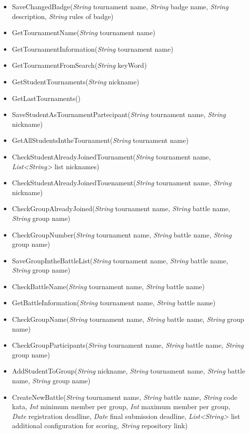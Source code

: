 \begin{itemize}
\begin{itemize}
        \item SaveChangedBadge(\textit{String} tournament name, \textit{String} badge name, \textit{String} description, \textit{String} rules of badge)
        \item GetTournamentName(\textit{String} tournament name)
        \item GetTournamentInformation(\textit{String} tournament name)
        \item GetTournamentFromSearch(\textit{String} keyWord)
        \item GetStudentTournaments(\textit{String} nickname)
        \item GetLastTournaments()
        \item SaveStudentAsTournamentPartecipant(\textit{String} tournament name, \textit{String} nickname)
        \item GetAllStudentsIntheTournament(\textit{String} tournament name)
        \item CheckStudentAlreadyJoinedTournament(\textit{String} tournament name, \textit{List\textless String\textgreater} list nicknames)
        \item CheckStudentAlreadyJoinedTouenament(\textit{String} tournament name, \textit{String} nickname)
        \item CheckGroupAlreadyJoined(\textit{String} tournament name, \textit{String} battle name, \textit{String} group name)
        \item CheckGroupNumber(\textit{String} tournament name, \textit{String} battle name, \textit{String} group name)
        \item SaveGroupIntheBattleList(\textit{String} tournament name, \textit{String} battle name, \textit{String} group name)
        \item CheckBattleName(\textit{String} tournament name, \textit{String} battle name)
        \item GetBattleInformation(\textit{String} tournament name, \textit{String} battle name)
        \item CheckGroupName(\textit{String} tournament name, \textit{String} battle name, \textit{String} group name)
        \item CheckGroupParticipants(\textit{String} tournament name, \textit{String} battle name, \textit{String} group name)
        \item AddStudentToGroup(\textit{String} nickname, \textit{String} tournament name, \textit{String} battle name, \textit{String} group name)
        \item CreateNewBattle(\textit{String} tournament name, \textit{String} battle name, \textit{String} code kata, \textit{Int}  minimum member per group, \textit{Int}  maximum member per group, \textit{Date} registration deadline, \textit{Date} final submission deadline, \textit{List\textless String\textgreater} list additional configuration for scoring, \textit{String} repository link)

\end{itemize}
\end{itemize}
